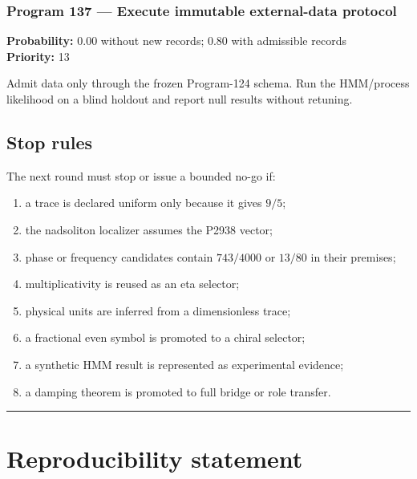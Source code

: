 \documentclass[11pt,a4paper,openany]{report}
\begin{document}
\subsection{Program 137 --- Execute immutable external-data protocol}

\textbf{Probability:} 0.00 without new records; 0.80 with admissible records\\
\textbf{Priority:} 13

Admit data only through the frozen Program-124 schema. Run the HMM/\allowbreak{}process likelihood on a blind holdout and report null results without retuning.

\section{Stop rules}

The next round must stop or issue a bounded no-go if:

\begin{enumerate}
\item 
a trace is declared uniform only because it gives \(9/5\);

\item 
the nadsoliton localizer assumes the P2938 vector;

\item 
phase or frequency candidates contain \(743/4000\) or \(13/80\) in their premises;

\item 
multiplicativity is reused as an eta selector;

\item 
physical units are inferred from a dimensionless trace;

\item 
a fractional even symbol is promoted to a chiral selector;

\item 
a synthetic HMM result is represented as experimental evidence;

\item 
a damping theorem is promoted to full bridge or role transfer.

\end{enumerate}

\par\medskip\hrule\medskip

\chapter{Reproducibility statement}
\end{document}
